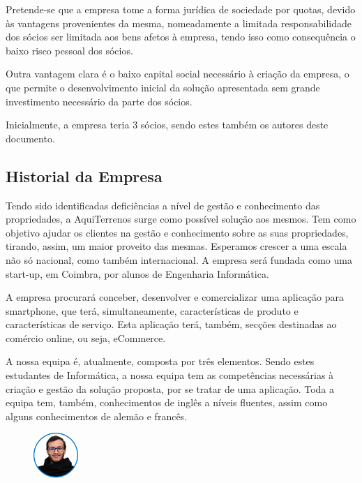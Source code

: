 \documentclass[11pt]{article}
\begin{document}
	Pretende-se que a empresa tome a forma jurídica de sociedade por quotas, devido às vantagens provenientes da mesma, nomeadamente a limitada responsabilidade dos sócios ser limitada aos bens afetos à empresa, tendo isso como consequência o baixo risco pessoal dos sócios.
	
	Outra vantagem clara é o baixo capital social necessário à criação da empresa, o que permite o desenvolvimento inicial da solução apresentada sem grande investimento necessário da parte dos sócios.
	
	Inicialmente, a empresa teria 3 sócios, sendo estes também os autores deste documento.
	
	\pagebreak
	
	\large
	\subsection{Historial da Empresa}
	
	\normalsize
	
	Tendo sido identificadas deficiências a nível de gestão e conhecimento das propriedades, a AquiTerrenos surge como possível solução aos mesmos. Tem como objetivo ajudar os clientes na gestão e conhecimento sobre as suas propriedades, tirando, assim, um maior proveito das mesmas. Esperamos crescer a uma escala não só nacional, como também internacional. A empresa será fundada como uma start-up, em Coimbra, por alunos de Engenharia Informática.
	
	A empresa procurará conceber, desenvolver e comercializar uma aplicação para smartphone, que terá, simultaneamente, características de produto e características de serviço. Esta aplicação terá, também, secções destinadas ao comércio online, ou seja, eCommerce.
	
	A nossa equipa é, atualmente, composta por três elementos. Sendo estes estudantes de Informática, a nossa equipa tem as competências necessárias à criação e gestão da solução proposta, por se tratar de uma aplicação. Toda a equipa tem, também, conhecimentos de inglês a níveis fluentes, assim como alguns conhecimentos de alemão e francês.
	
	\vspace{1cm}
	
	\begin{figure}[h]
		\includegraphics[width=0.15\textwidth,keepaspectratio]{jalmeida}
		\label{fig:ja}
		\centering
	\end{figure}
	
\end{document}
